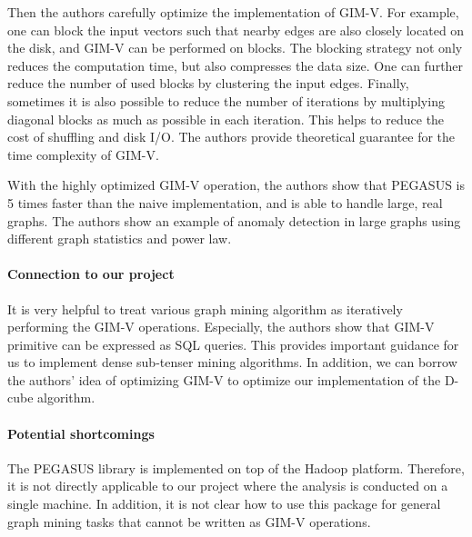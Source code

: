 Then the authors carefully optimize the implementation of GIM-V. For example, one can block the input vectors such that nearby edges are also closely located on the disk, and GIM-V can be performed on blocks. The blocking strategy not only reduces the computation time, but also compresses the data size. One can further reduce the number of used blocks by clustering the input edges. Finally, sometimes it is also possible to reduce the number of iterations by multiplying diagonal blocks as much as possible in each iteration. This helps to reduce the cost of shuffling and disk I/O. The authors provide theoretical guarantee for the time complexity of GIM-V.

With the highly optimized GIM-V operation, the authors show that PEGASUS is 5 times faster than the naive implementation, and is able to handle large, real graphs. The authors show an example of anomaly detection in large graphs using different graph statistics and power law. 


\paragraph{Connection to our project} 
It is very helpful to treat various graph mining algorithm as iteratively performing the GIM-V operations. Especially, the authors show that GIM-V primitive can be expressed as SQL queries. This provides important guidance for us to implement dense sub-tenser mining algorithms. In addition, we can borrow the authors' idea of optimizing GIM-V  to optimize our implementation of the D-cube algorithm.

\paragraph{Potential shortcomings} The PEGASUS library is implemented on top of the Hadoop platform. Therefore, it is not directly applicable to our project where the analysis is conducted on a single machine. In addition, it is not clear how to use this package for general graph mining tasks that cannot be written as GIM-V operations.


